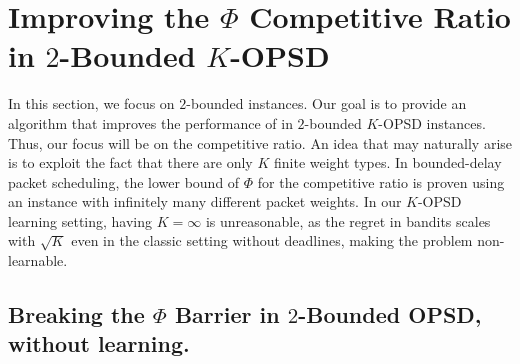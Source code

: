 \section{Improving the $\Phi$ Competitive Ratio in $2$-Bounded $K$-OPSD}
\label{sec:twoboundeddet}
In this section, we focus on $2$-bounded instances. Our goal is to provide an algorithm that improves the performance of \algedflearn in $2$-bounded $K$-OPSD instances. Thus, our focus will be on the competitive ratio.
An idea that may naturally arise is to exploit the fact that there are only $K$ finite weight types.
In bounded-delay packet scheduling, the lower bound of $\Phi$ for the competitive ratio is proven using an instance with infinitely many different packet weights. 
In our $K$-OPSD learning setting, having $K = \infty$ is unreasonable, as the regret in bandits scales with $\sqrt{K}$ even in the classic setting without deadlines, making the problem non-learnable. 

\subsection{Breaking the $\Phi$ Barrier in $2$-Bounded OPSD, without learning.} 


